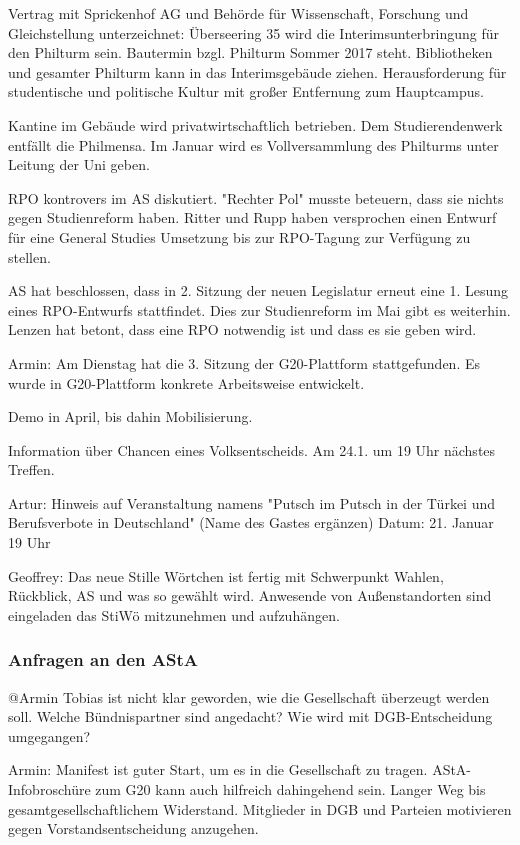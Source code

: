 \documentclass[ngerman,headheight=70pt]{scrartcl}
\begin{document}
    Vertrag mit Sprickenhof AG und Behörde für Wissenschaft, Forschung und
    Gleichstellung unterzeichnet:
    Überseering 35 wird die Interimsunterbringung für den Philturm sein. Bautermin
    bzgl. Philturm Sommer 2017 steht. Bibliotheken und gesamter Philturm kann
    in das Interimsgebäude ziehen. Herausforderung für studentische und politische
    Kultur mit großer Entfernung zum Hauptcampus.

    Kantine im Gebäude wird privatwirtschaftlich betrieben. Dem Studierendenwerk
    entfällt die Philmensa. Im Januar wird es Vollversammlung des Philturms
    unter Leitung der Uni geben.

    RPO kontrovers im AS diskutiert. "Rechter Pol" musste beteuern, dass sie
    nichts gegen Studienreform haben. Ritter und Rupp haben versprochen einen Entwurf
    für eine General Studies Umsetzung bis zur RPO-Tagung zur Verfügung zu stellen.

    AS hat beschlossen, dass in 2. Sitzung der neuen Legislatur erneut eine 1.
    Lesung eines RPO-Entwurfs stattfindet. Dies zur Studienreform im Mai gibt
    es weiterhin. Lenzen hat betont, dass eine RPO notwendig ist und dass es sie
    geben wird.

    Armin:
    Am Dienstag hat die 3. Sitzung der G20-Plattform stattgefunden. Es wurde
    in G20-Plattform konkrete Arbeitsweise entwickelt.

    Demo in April, bis dahin Mobilisierung.

    Information über Chancen eines Volksentscheids. Am 24.1. um 19 Uhr nächstes
    Treffen.

    Artur:
    Hinweis auf Veranstaltung namens "Putsch im Putsch in der Türkei und
    Berufsverbote in Deutschland" (Name des Gastes ergänzen)
    Datum: 21. Januar 19 Uhr

    Geoffrey:
    Das neue Stille Wörtchen ist fertig mit Schwerpunkt Wahlen, Rückblick, AS
    und was so gewählt wird. Anwesende von Außenstandorten sind eingeladen das
    StiWö mitzunehmen und aufzuhängen.

    \subsubsection{Anfragen an den AStA}

    @Armin
    Tobias ist nicht klar geworden, wie die Gesellschaft überzeugt werden soll.
    Welche Bündnispartner sind angedacht? Wie wird mit DGB-Entscheidung umgegangen?

    Armin:
    Manifest ist guter Start, um es in die Gesellschaft zu tragen.
    AStA-Infobroschüre zum G20 kann auch hilfreich dahingehend sein. Langer Weg
    bis gesamtgesellschaftlichem Widerstand. Mitglieder in DGB und Parteien
    motivieren gegen Vorstandsentscheidung anzugehen.
\end{document}
